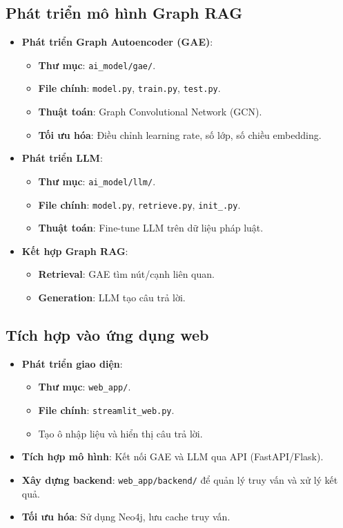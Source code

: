 \documentclass[a4paper,12pt]{article}
\begin{document}
\subsection{Phát triển mô hình Graph RAG}
\begin{itemize}
    \item \textbf{Phát triển Graph Autoencoder (GAE)}:
    \begin{itemize}
        \item \textbf{Thư mục}: \texttt{ai\_model/gae/}.
        \item \textbf{File chính}: \texttt{model.py}, \texttt{train.py}, \texttt{test.py}.
        \item \textbf{Thuật toán}: Graph Convolutional Network (GCN).
        \item \textbf{Tối ưu hóa}: Điều chỉnh learning rate, số lớp, số chiều embedding.
    \end{itemize}
    \item \textbf{Phát triển LLM}:
    \begin{itemize}
        \item \textbf{Thư mục}: \texttt{ai\_model/llm/}.
        \item \textbf{File chính}: \texttt{model.py}, \texttt{retrieve.py}, \texttt{init\_.py}.
        \item \textbf{Thuật toán}: Fine-tune LLM trên dữ liệu pháp luật.
    \end{itemize}
    \item \textbf{Kết hợp Graph RAG}:
    \begin{itemize}
        \item \textbf{Retrieval}: GAE tìm nút/cạnh liên quan.
        \item \textbf{Generation}: LLM tạo câu trả lời.
    \end{itemize}
\end{itemize}

\subsection{Tích hợp vào ứng dụng web}
\begin{itemize}
    \item \textbf{Phát triển giao diện}:
    \begin{itemize}
        \item \textbf{Thư mục}: \texttt{web\_app/}.
        \item \textbf{File chính}: \texttt{streamlit\_web.py}.
        \item Tạo ô nhập liệu và hiển thị câu trả lời.
    \end{itemize}
    \item \textbf{Tích hợp mô hình}: Kết nối GAE và LLM qua API (FastAPI/Flask).
    \item \textbf{Xây dựng backend}: \texttt{web\_app/backend/} để quản lý truy vấn và xử lý kết quả.
    \item \textbf{Tối ưu hóa}: Sử dụng Neo4j, lưu cache truy vấn.
\end{itemize}
\end{document}
